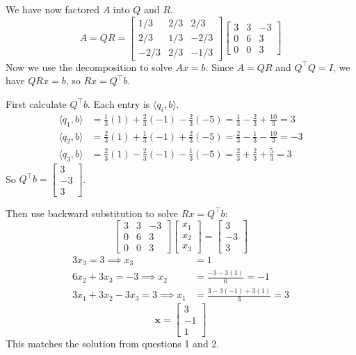 \documentclass[11pt]{article}
\begin{document}
We have now factored $A$ into $Q$ and $R$.
$$
A=QR=\begin{bmatrix}
1/3 &2/3&2/3\\
2/3 & 1/3 &-2/3\\
-2/3 & 2/3 &-1/3
\end{bmatrix}
\begin{bmatrix}
    3&3&-3\\
    0&6&3\\
    0&0&3
\end{bmatrix}
$$
Now we use the decomposition to solve $Ax=b$. Since $A=QR$ and $Q^\top Q=I$, we have $QRx=b$, so $Rx=Q^\top b$.\\
\medskip

\noindent First calculate $Q^\top b$. Each entry is $\langle q_i,b\rangle$.
\begin{align*}
\langle q_1,b\rangle &= \tfrac13(1)+\tfrac23(-1)-\tfrac23(-5) = \tfrac13-\tfrac23+\tfrac{10}{3} = 3\\
\langle q_2,b\rangle &= \tfrac23(1)+\tfrac13(-1)+\tfrac23(-5) = \tfrac23-\tfrac13-\tfrac{10}{3} = -3\\
\langle q_3,b\rangle &= \tfrac23(1)-\tfrac23(-1)-\tfrac13(-5) = \tfrac23+\tfrac23+\tfrac53 = 3
\end{align*}
So $Q^\top b=\begin{bmatrix} 3\\-3\\3 \end{bmatrix}$.

\bigskip
\noindent Then use backward substitution to solve $Rx=Q^\top b$:
$$
\begin{bmatrix}
    3&3&-3\\
    0&6&3\\
    0&0&3
\end{bmatrix}
\begin{bmatrix} x_1\\x_2\\x_3 \end{bmatrix}
=\begin{bmatrix} 3\\-3\\3 \end{bmatrix}
$$
\begin{align*}
3x_3 = 3 \implies x_3 &= 1\\
6x_2 + 3x_3 = -3 \implies x_2 &= \frac{-3-3(1)}{6} = -1\\
3x_1 + 3x_2 - 3x_3 = 3 \implies x_1 &= \frac{3-3(-1)+3(1)}{3} = 3
\end{align*}
$$
\mathbf{x}=\begin{bmatrix} 3\\-1\\1 \end{bmatrix}
$$
This matches the solution from questions 1 and 2.
\bigskip
\end{document}
